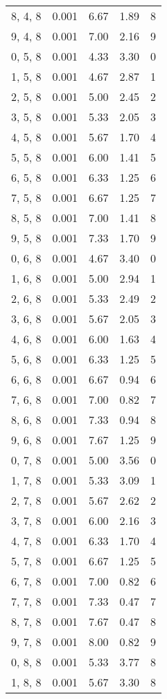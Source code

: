 \documentclass[12pt]{article}
\begin{document}
\begin{tabular}{c || c || c | c | c}
8, 4, 8 & 0.001 & 6.67 & 1.89 & 8 \\
9, 4, 8 & 0.001 & 7.00 & 2.16 & 9 \\
0, 5, 8 & 0.001 & 4.33 & 3.30 & 0 \\
1, 5, 8 & 0.001 & 4.67 & 2.87 & 1 \\
2, 5, 8 & 0.001 & 5.00 & 2.45 & 2 \\
3, 5, 8 & 0.001 & 5.33 & 2.05 & 3 \\
4, 5, 8 & 0.001 & 5.67 & 1.70 & 4 \\
5, 5, 8 & 0.001 & 6.00 & 1.41 & 5 \\
6, 5, 8 & 0.001 & 6.33 & 1.25 & 6 \\
7, 5, 8 & 0.001 & 6.67 & 1.25 & 7 \\
8, 5, 8 & 0.001 & 7.00 & 1.41 & 8 \\
9, 5, 8 & 0.001 & 7.33 & 1.70 & 9 \\
0, 6, 8 & 0.001 & 4.67 & 3.40 & 0 \\
1, 6, 8 & 0.001 & 5.00 & 2.94 & 1 \\
2, 6, 8 & 0.001 & 5.33 & 2.49 & 2 \\
3, 6, 8 & 0.001 & 5.67 & 2.05 & 3 \\
4, 6, 8 & 0.001 & 6.00 & 1.63 & 4 \\
5, 6, 8 & 0.001 & 6.33 & 1.25 & 5 \\
6, 6, 8 & 0.001 & 6.67 & 0.94 & 6 \\
7, 6, 8 & 0.001 & 7.00 & 0.82 & 7 \\
8, 6, 8 & 0.001 & 7.33 & 0.94 & 8 \\
9, 6, 8 & 0.001 & 7.67 & 1.25 & 9 \\
0, 7, 8 & 0.001 & 5.00 & 3.56 & 0 \\
1, 7, 8 & 0.001 & 5.33 & 3.09 & 1 \\
2, 7, 8 & 0.001 & 5.67 & 2.62 & 2 \\
3, 7, 8 & 0.001 & 6.00 & 2.16 & 3 \\
4, 7, 8 & 0.001 & 6.33 & 1.70 & 4 \\
5, 7, 8 & 0.001 & 6.67 & 1.25 & 5 \\
6, 7, 8 & 0.001 & 7.00 & 0.82 & 6 \\
7, 7, 8 & 0.001 & 7.33 & 0.47 & 7 \\
8, 7, 8 & 0.001 & 7.67 & 0.47 & 8 \\
9, 7, 8 & 0.001 & 8.00 & 0.82 & 9 \\
0, 8, 8 & 0.001 & 5.33 & 3.77 & 8 \\
1, 8, 8 & 0.001 & 5.67 & 3.30 & 8 \\

\end{tabular}
\end{document}
